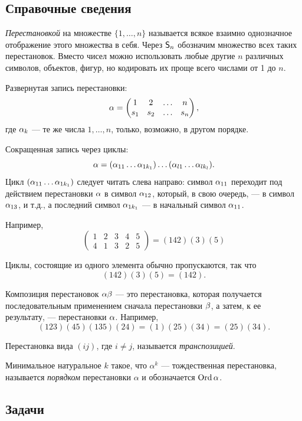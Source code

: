 
\subsection*{Справочные сведения}

\textit{Перестановкой} на множестве $\{1,\dots,n\}$ называется всякое взаимно однозначное отображение этого множества в себя. Через ${\mathsf{S}}_n$ обозначим множество всех таких перестановок. Вместо чисел можно использовать любые другие $n$ различных символов, объектов, фигур, но кодировать их проще всего числами от 1 до $n$.

Развернутая запись перестановки:
$$
\alpha=\begin{pmatrix} 1 & 2& \dots & n \\
s_1 & s_2 & \dots & s_n
\end{pmatrix},
$$
где $\alpha_k$ --- те же числа $1,\dots, n$, только, возможно, в другом порядке.

Сокращенная запись через циклы:
$$
\alpha=(\alpha_{11}\dots \alpha_{1k_1})\dots(\alpha_{l1}\dots \alpha_{lk_l}).
$$
Цикл $(\alpha_{11}\dots \alpha_{1k_1})$ следует читать слева направо: символ $\alpha_{11}$ переходит под действием перестановки $\alpha$ в символ $\alpha_{12}$, который, в свою очередь, --- в символ $\alpha_{13}$, и т.д., а последний символ $\alpha_{1k_1}$ --- в начальный символ $\alpha_{11}$.

Например,
$$
\begin{pmatrix}
1 & 2 & 3 & 4 & 5 \\
4 & 1 & 3 & 2 & 5\end{pmatrix} = (142)(3)(5)
$$

Циклы, состоящие из одного элемента обычно пропускаются, так что
$$
(142)(3)(5) = (142).
$$

Композиция перестановок $\alpha\beta$ --- это перестановка, которая получается последовательным применением сначала перестановки $\beta$, а затем, к ее результату, --- перестановки $\alpha$. Например,
$$
(123)(45) (135)(24) = (1)(25)(34) = (25)(34).
$$

Перестановка вида $(ij)$, где $i\ne j$, называется \textit{транспозицией}.

Минимальное натуральное $k$ такое, что $\alpha^k$ --- тождественная перестановка, называется {\it порядком} перестановки $\alpha$ и обозначается $\mathop{\mathrm{Ord}}\alpha$.

\subsection*{Задачи}


